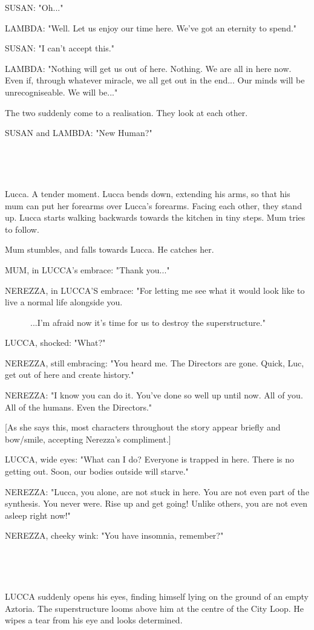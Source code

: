 \documentclass[11pt]{article}
\begin{document}
SUSAN: "Oh..."

LAMBDA: "Well. 
Let us enjoy our time here. 
We've got an eternity to spend."

SUSAN: "I can't accept this."

LAMBDA: "Nothing will get us out of here. 
Nothing.
We are all in here now.
Even if, through whatever miracle, we all get out in the end...
Our minds will be unrecogniseable.
We will be..."

The two suddenly come to a realisation.
They look at each other.

SUSAN and LAMBDA: "New Human?"

\ 

\ 

Lucca.
A tender moment.
Lucca bends down, extending his arms, so that his mum can put her forearms over Lucca's forearms.
Facing each other, they stand up.
Lucca starts walking backwards towards the kitchen in tiny steps.
Mum tries to follow.

Mum stumbles, and falls towards Lucca.
He catches her.

MUM, in LUCCA's embrace: "Thank you..."

NEREZZA, in LUCCA'S embrace: "For letting me see what it would look like to live a normal life alongside you.

\ \ \ \ \ \ ...I'm afraid now it's time for us to destroy the superstructure."

LUCCA, shocked: "What?"

NEREZZA, still embracing: "You heard me.
The Directors are gone.
Quick, Luc, get out of here and create history."

NEREZZA: "I know you can do it.
You've done so well up until now.
All of you.
All of the humans.
Even the Directors."

[As she says this, most characters throughout the story appear briefly and bow/smile, accepting Nerezza's compliment.]

LUCCA, wide eyes: "What can I do? 
Everyone is trapped in here. 
There is no getting out.
Soon, our bodies outside will starve."

NEREZZA: "Lucca, you alone, are not stuck in here. 
You are not even part of the synthesis.
You never were. 
Rise up and get going!
Unlike others, you are not even asleep right now!"

NEREZZA, cheeky wink: "You have insomnia, remember?"

\ 

\ 

LUCCA suddenly opens his eyes, finding himself lying on the ground of an empty Aztoria.
The superstructure looms above him at the centre of the City Loop.
He wipes a tear from his eye and looks determined.
\end{document}

